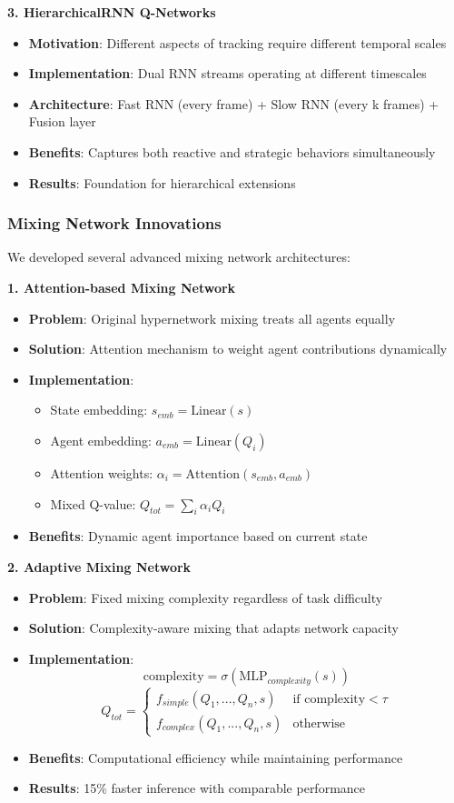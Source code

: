\documentclass[12pt,a4paper]{report}
\begin{document}
\textbf{3. HierarchicalRNN Q-Networks}
\begin{itemize}
\item \textbf{Motivation}: Different aspects of tracking require different temporal scales
\item \textbf{Implementation}: Dual RNN streams operating at different timescales
\item \textbf{Architecture}: Fast RNN (every frame) + Slow RNN (every k frames) + Fusion layer
\item \textbf{Benefits}: Captures both reactive and strategic behaviors simultaneously
\item \textbf{Results}: Foundation for hierarchical extensions
\end{itemize}

\subsubsection{Mixing Network Innovations}
We developed several advanced mixing network architectures:

\textbf{1. Attention-based Mixing Network}
\begin{itemize}
\item \textbf{Problem}: Original hypernetwork mixing treats all agents equally
\item \textbf{Solution}: Attention mechanism to weight agent contributions dynamically
\item \textbf{Implementation}: 
\begin{itemize}
\item State embedding: $s_{emb} = \text{Linear}(s)$
\item Agent embedding: $a_{emb} = \text{Linear}(Q_i)$
\item Attention weights: $\alpha_i = \text{Attention}(s_{emb}, a_{emb})$
\item Mixed Q-value: $Q_{tot} = \sum_i \alpha_i Q_i$
\end{itemize}
\item \textbf{Benefits}: Dynamic agent importance based on current state
\end{itemize}

\textbf{2. Adaptive Mixing Network}
\begin{itemize}
\item \textbf{Problem}: Fixed mixing complexity regardless of task difficulty
\item \textbf{Solution}: Complexity-aware mixing that adapts network capacity
\item \textbf{Implementation}:
$$\text{complexity} = \sigma(\text{MLP}_{complexity}(s))$$
$$Q_{tot} = \begin{cases}
f_{simple}(Q_1, ..., Q_n, s) & \text{if complexity} < \tau \\
f_{complex}(Q_1, ..., Q_n, s) & \text{otherwise}
\end{cases}$$
\item \textbf{Benefits}: Computational efficiency while maintaining performance
\item \textbf{Results}: 15\% faster inference with comparable performance
\end{itemize}
\end{document}
